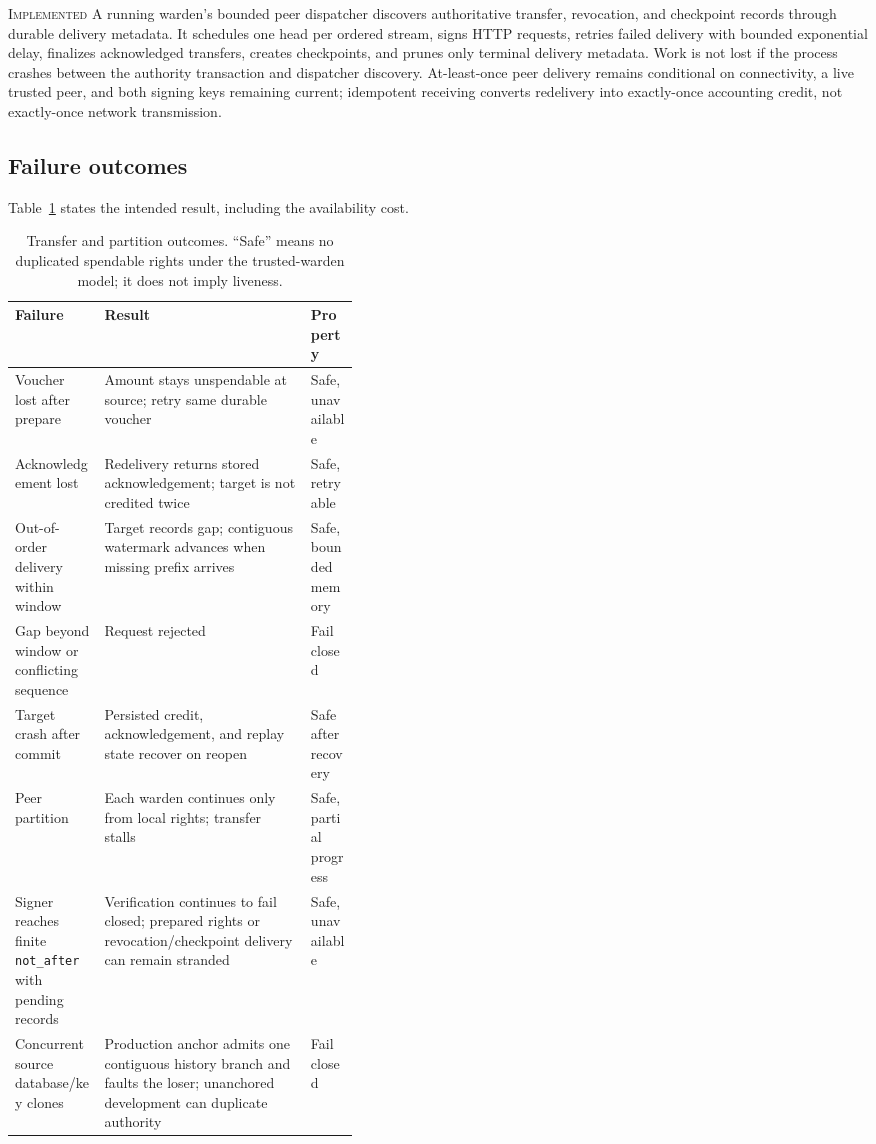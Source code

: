 \documentclass[10pt]{article}
\newcommand{\impl}{\textsc{Implemented}}
\newcommand{\code}[1]{\nolinkurl{#1}}
\begin{document}
\impl{} A running warden's bounded peer dispatcher discovers authoritative transfer, revocation,
and checkpoint records through durable delivery metadata. It schedules one head per ordered
stream, signs HTTP requests, retries failed delivery with bounded exponential delay, finalizes
acknowledged transfers, creates checkpoints, and prunes only terminal delivery metadata. Work is
not lost if the process crashes between the authority transaction and dispatcher discovery.
At-least-once peer delivery remains conditional on connectivity, a live trusted peer, and both
signing keys remaining current; idempotent receiving converts redelivery into exactly-once
accounting credit, not exactly-once network transmission.

\subsection{Failure outcomes}

Table~\ref{tab:failures} states the intended result, including the availability cost.

\begin{table}[ht]
\centering
\caption{Transfer and partition outcomes. ``Safe'' means no duplicated spendable rights under the
trusted-warden model; it does not imply liveness.}
\label{tab:failures}
\small
\begin{tabularx}{\linewidth}{@{}p{0.26\linewidth}X p{0.14\linewidth}@{}}
\toprule
Failure & Result & Property \\
\midrule
Voucher lost after prepare & Amount stays unspendable at source; retry same durable voucher & Safe, unavailable \\
\addlinespace
Acknowledgement lost & Redelivery returns stored acknowledgement; target is not credited twice & Safe, retryable \\
\addlinespace
Out-of-order delivery within window & Target records gap; contiguous watermark advances when missing prefix arrives & Safe, bounded memory \\
\addlinespace
Gap beyond window or conflicting sequence & Request rejected & Fail closed \\
\addlinespace
Target crash after commit & Persisted credit, acknowledgement, and replay state recover on reopen & Safe after recovery \\
\addlinespace
Peer partition & Each warden continues only from local rights; transfer stalls & Safe, partial progress \\
\addlinespace
Signer reaches finite \code{not_after} with pending records & Verification continues to fail closed; prepared rights or revocation/checkpoint delivery can remain stranded & Safe, unavailable \\
\addlinespace
Concurrent source database/key clones & Production anchor admits one contiguous history branch and faults the loser; unanchored development can duplicate authority & Fail closed \\
\bottomrule
\end{tabularx}
\end{table}
\end{document}
